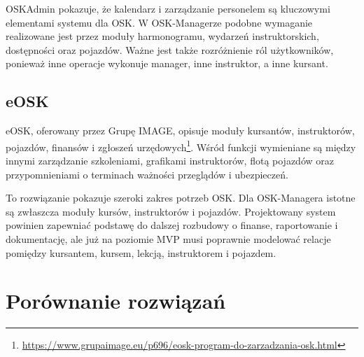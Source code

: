 OSKAdmin pokazuje, że kalendarz i zarządzanie personelem są kluczowymi elementami systemu dla OSK. W OSK-Managerze podobne wymaganie realizowane jest przez moduły harmonogramu, wydarzeń instruktorskich, dostępności oraz pojazdów. Ważne jest także rozróżnienie ról użytkowników, ponieważ inne operacje wykonuje manager, inne instruktor, a inne kursant.

\subsection{eOSK}
\label{subsec:eosk}

eOSK, oferowany przez Grupę IMAGE, opisuje moduły kursantów, instruktorów, pojazdów, finansów i zgłoszeń urzędowych\footnote{\url{https://www.grupaimage.eu/p696/eosk-program-do-zarzadzania-osk.html}}. Wśród funkcji wymieniane są między innymi zarządzanie szkoleniami, grafikami instruktorów, flotą pojazdów oraz przypomnieniami o terminach ważności przeglądów i ubezpieczeń.

To rozwiązanie pokazuje szeroki zakres potrzeb OSK. Dla OSK-Managera istotne są zwłaszcza moduły kursów, instruktorów i pojazdów. Projektowany system powinien zapewniać podstawę do dalszej rozbudowy o finanse, raportowanie i dokumentację, ale już na poziomie MVP musi poprawnie modelować relacje pomiędzy kursantem, kursem, lekcją, instruktorem i pojazdem.

\section{Porównanie rozwiązań}
\label{sec:porownanieRozwiazan}

